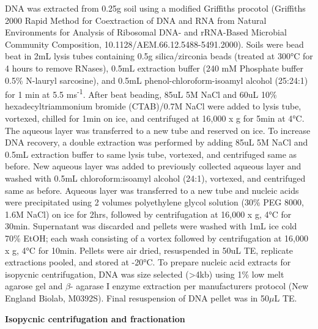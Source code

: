 DNA was extracted from 0.25g soil using a modified Griffiths procotol (Griffiths 2000 Rapid Method for Coextraction of DNA and RNA from Natural Environments for Analysis of Ribosomal DNA- and rRNA-Based Microbial Community Composition, 10.1128/AEM.66.12.5488-5491.2000).  Soils were bead beat in 2mL lysis tubes containing 0.5g silica/zirconia beads (treated at 300°C for 4 hours to remove RNases), 0.5mL extraction buffer (240 mM Phosphate buffer
0.5\% N-lauryl sarcosine), and 0.5mL phenol-chloroform-isoamyl alcohol (25:24:1) for 1 min at 5.5 ms\textsuperscript{-1}. After beat beading, 85uL 5M NaCl and 60uL 10\% hexadecyltriammonium bromide (CTAB)/0.7M NaCl were added to lysis tube, vortexed, chilled for 1min on ice, and centrifuged at 16,000 x g for 5min at 4°C.  The aqueous layer was transferred to a new tube and reserved on ice.  To increase DNA recovery, a double extraction was performed by adding 85uL 5M NaCl and 0.5mL extraction buffer to same lysis tube, vortexed, and centrifuged same as before.  New aqueous layer was added to previously collected aqueous layer and washed with 0.5mL chloroform:isoamyl alcohol (24:1), vortexed, and centrifuged same as before.  Aqueous layer was transferred to a new tube and nucleic acids were precipitated using 2 volumes polyethylene glycol solution (30\% PEG 8000, 1.6M NaCl) on ice for 2hrs, followed by centrifugation at 16,000 x g, 4°C for 30min.  Supernatant was discarded and pellets were washed with 1mL ice cold 70\% EtOH; each wash consisting of a vortex followed by centrifugation at 16,000 x g, 4°C for 10min.  Pellets were air dried, resuspended in 50uL TE, replicate extractions pooled, and stored at -20°C. To prepare nucleic acid extracts for isopycnic centrifugation, DNA was size selected (>4kb) using 1\% low melt agarose gel and $\beta$- agarase I enzyme extraction per manufacturers protocol (New England Biolab, M0392S).  Final resuspension of DNA pellet was in 50$\mu$L TE.   


\textbf{Isopycnic centrifugation and fractionation}

